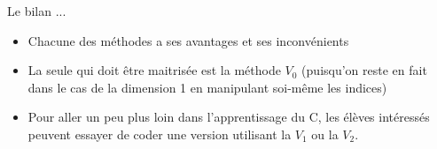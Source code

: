 \documentclass[10pt]{beamer}
\begin{document}
\begin{frame}{\Ctitle}{\stitle}
	\begin{block}{Le bilan ...}
		\begin{itemize}
			\item<1-> Chacune des méthodes a ses avantages et ses inconvénients
			\item<2-> La seule qui doit être maitrisée est la méthode $V_0$ (puisqu'on reste en fait dans le cas de la dimension 1 en manipulant soi-même les indices)
			\item<3-> Pour aller un peu plus loin dans l'apprentissage du C, les élèves intéressés peuvent essayer de coder une version utilisant la $V_1$ ou la $V_2$.
		\end{itemize}
	\end{block}
\end{frame}
\end{document}
